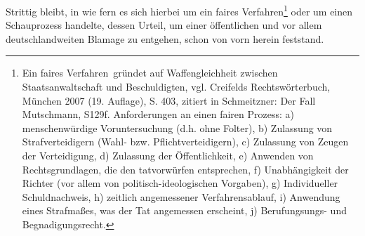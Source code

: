 Strittig bleibt, in wie fern es sich hierbei um ein faires Verfahren\footnote{Ein \glqq faires Verfahren\grqq~gründet auf Waffengleichheit zwischen Staatsanwaltschaft und Beschuldigten, vgl. Creifelds Rechtswörterbuch, München 2007 (19. Auflage), S. 403, zitiert in Schmeitzner: Der Fall Mutschmann, S129f. Anforderungen an einen fairen Prozess: 
a) menschenwürdige Voruntersuchung (d.h. ohne Folter), b) Zulassung von Strafverteidigern (Wahl- bzw. Pflichtverteidigern), c) Zulassung von Zeugen der Verteidigung, d) Zulassung der Öffentlichkeit, e) Anwenden von Rechtsgrundlagen, die den tatvorwürfen entsprechen, f) Unabhängigkeit der Richter (vor allem von politisch-ideologischen Vorgaben), g) Individueller Schuldnachweis, h) zeitlich angemessener Verfahrensablauf, i) Anwendung eines Strafmaßes, was der Tat angemessen erscheint, j) Berufungsungs- und Begnadigungsrecht.} oder um einen Schauprozess handelte, dessen Urteil, um einer öffentlichen und vor allem deutschlandweiten Blamage zu entgehen, schon von vorn herein feststand.\newline 


